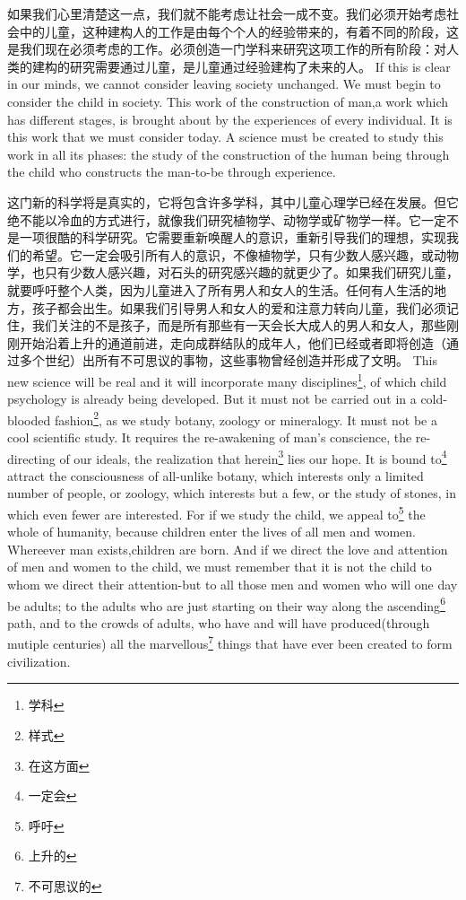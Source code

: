 \documentclass[lang=cn,10pt]{elegantbook}
\begin{document}
\begin{tcolorbox}[title=译文,
colback=red!5!white,
colframe=red!75!black,
fonttitle=\bfseries]
如果我们心里清楚这一点，我们就不能考虑让社会一成不变。我们必须开始考虑社会中的儿童，这种建构人的工作是由每个个人的经验带来的，有着不同的阶段，这是我们现在必须考虑的工作。必须创造一门学科来研究这项工作的所有阶段：对人类的建构的研究需要通过儿童，是儿童通过经验建构了未来的人。
If this is clear in our minds, we cannot consider leaving society unchanged. We must begin to consider the child in society. This work of the construction of man,a work which has different stages, is brought about by the experiences of every individual. It is this work that we must consider today. A science must be created to study this work in all its phases: the study of the construction of the human being through the child who constructs the man-to-be through experience.
\end{tcolorbox}

\begin{tcolorbox}[title=译文,
colback=red!5!white,
colframe=red!75!black,
fonttitle=\bfseries]
这门新的科学将是真实的，它将包含许多学科，其中儿童心理学已经在发展。但它绝不能以冷血的方式进行，就像我们研究植物学、动物学或矿物学一样。它一定不是一项很酷的科学研究。它需要重新唤醒人的意识，重新引导我们的理想，实现我们的希望。它一定会吸引所有人的意识，不像植物学，只有少数人感兴趣，或动物学，也只有少数人感兴趣，对石头的研究感兴趣的就更少了。如果我们研究儿童，就要呼吁整个人类，因为儿童进入了所有男人和女人的生活。任何有人生活的地方，孩子都会出生。如果我们引导男人和女人的爱和注意力转向儿童，我们必须记住，我们关注的不是孩子，而是所有那些有一天会长大成人的男人和女人，那些刚刚开始沿着上升的通道前进，走向成群结队的成年人，他们已经或者即将创造（通过多个世纪）出所有不可思议的事物，这些事物曾经创造并形成了文明。
This new science will be real and it will incorporate many disciplines\footnote{学科}, of which child psychology is already being developed. But it must not be carried out in a cold-blooded fashion\footnote{样式}, as we study botany, zoology or mineralogy. It must not be a cool scientific study. It requires the re-awakening of man's conscience, the re-directing of our ideals, the realization that herein\footnote{在这方面} lies our hope. It is bound to\footnote{一定会} attract the consciousness of all-unlike botany, which interests only a limited number of people, or zoology, which interests but a few, or the study of stones, in which even fewer are interested. For if we study the child, we appeal to\footnote{呼吁} the whole of humanity, because children enter the lives of all men and women. Whereever man exists,children are born. And if we direct the love and attention of men and women to the child, we must remember that it is not the child to whom we direct their attention-but to all those men and women who will one day be adults; to the adults who are just starting on their way along the ascending\footnote{上升的} path, and to the crowds of adults, who have and will have produced(through mutiple centuries) all the marvellous\footnote{不可思议的} things that have ever been created to form civilization.
\end{tcolorbox}
\end{document}
